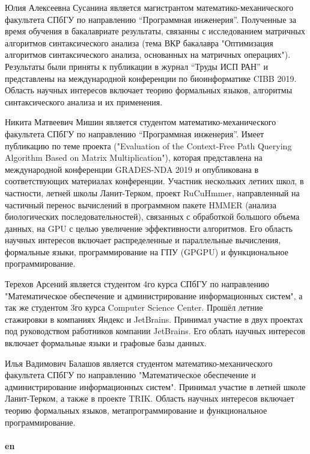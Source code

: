 \documentclass[12pt]{article}  %
\theoremstyle{remark}
\begin{document}
Юлия Алексеевна Сусанина является магистрантом математико-механического факультета СПбГУ по направлению “Программная инженерия”.
Полученные за время обучения в бакалавриате результаты, связанны с исследованием матричных алгоритмов синтаксического анализа (тема ВКР бакалавра "Оптимизация алгоритмов синтаксического
анализа, основанных на матричных
операциях"). Результаты были приняты к публикации в журнал “Труды ИСП РАН” и представлены на международной конференции по биоинформатике CIBB 2019.
Область научных интересов включает теорию формальных языков, алгоритмы синтаксического анализа и их применения.

Никита Матвеевич Мишин является студентом математико-механического факультета СПбГУ  по направлению “Программная инженерия”.
Имеет публикацию по теме проекта ("Evaluation of the Context-Free Path Querying Algorithm Based on Matrix Multiplication"), которая представлена на международной конференции GRADES-NDA 2019 и опубликована в соответствующих материалах конференции.
Участник нескольких летних школ, в частности, летней школы Ланит-Терком, проект RuCuHmmer,
направленный на частичный перенос вычислений в программном пакете HMMER (анализа биологических последовательностей),
связанных с обработкой большого объема данных, на GPU с целью увеличение эффективности алгоритмов.
Его область научных интересов включает распределенные и параллельные вычисления, формальные языки, программирование на ГПУ (GPGPU) и функциональное программирование.

Терехов Арсений является студентом 4го курса СПбГУ по направлению "Математическое обеспечение и администрирование информационных
систем", а так же студентом 3го курса Computer Science Center. Прошёл летние стажировки в компаниях Яндекс и JetBrains. Принимал участие в двух проектах под руководством работников компании JetBrains.
Его облать научных интересов включает формальные языки и графовые базы данных.

Илья Вадимович Балашов является студентом математико-механического факультета СПбГУ по направлению "Математическое обеспечение и администрирование информационных систем". Принимал участие в летней школе Ланит-Терком, а также в проекте TRIK.
Область научных интересов включает теорию формальных языков, метапрограммирование и функциональное программирование.
\\
\\
\textbf{en}
\end{document}
